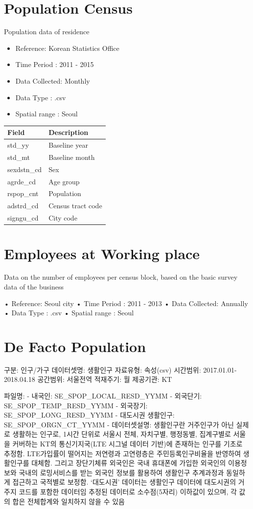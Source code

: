 \documentclass[]{book}
\providecommand{\tightlist}{%
  \setlength{\itemsep}{0pt}\setlength{\parskip}{0pt}}
\begin{document}
\section{Population Census}\label{population-census}

Population data of residence

\begin{itemize}
\tightlist
\item
  Reference: Korean Statistics Office
\item
  Time Period : 2011 - 2015
\item
  Data Collected: Monthly
\item
  Data Type : .csv
\item
  Spatial range : Seoul 
\end{itemize}

\begin{longtable}[]{@{}ll@{}}
\toprule
Field & Description\tabularnewline
\midrule
\endhead
std\_yy & Baseline year\tabularnewline
std\_mt & Baseline month\tabularnewline
sexdstn\_cd & Sex\tabularnewline
agrde\_cd & Age group\tabularnewline
rspop\_cnt & Population\tabularnewline
adstrd\_cd & Census tract code\tabularnewline
signgu\_cd & City code\tabularnewline
\bottomrule
\end{longtable}

\section{Employees at Working place}\label{employees-at-working-place}

Data on the number of employees per census block, based on the basic
survey data of the business

• Reference: Seoul city • Time Period : 2011 - 2013 • Data Collected:
Annually • Data Type : .csv • Spatial range : Seoul

\section{De Facto Population}\label{de-facto-population}

구분: 인구/가구 데이터셋명: 생활인구 자료유형: 속성(csv) 시간범위:
2017.01.01-2018.04.18 공간범위: 서울전역 적재주기: 월 제공기관: KT

파일명: - 내국인: SE\_SPOP\_LOCAL\_RESD\_YYMM - 외국단기:
SE\_SPOP\_TEMP\_RESD\_YYMM - 외국장기: SE\_SPOP\_LONG\_RESD\_YYMM -
대도시권 생활인구: SE\_SPOP\_ORGN\_CT\_YYMM - 데이터셋설명: 생활인구란
거주인구가 아닌 실제로 생활하는 인구로, 1시간 단위로 서울시 전체,
자치구별, 행정동별, 집계구별로 서울을 커버하는 KT의 통신기지국(LTE
시그널 데이터 기반)에 존재하는 인구를 기초로 추정함. LTE가입률이
떨어지는 저연령과 고연령층은 주민등록인구비율을 반영하여 생활인구를
대체함. 그리고 장단기체류 외국인은 국내 휴대폰에 가입한 외국인의
이용정보와 국내의 로밍서비스를 받는 외국인 정보를 활용하여 생활인구
추계과정과 동일하게 접근하고 국적별로 보정함. `대도시권' 데이터는
생활인구 데이터에 대도시권의 거주지 코드를 포함한 데이터임 추정된
데이터로 소수점(5자리) 이하값이 있으며, 각 값의 합은 전체합계와 일치하지
않을 수 있음
\end{document}
